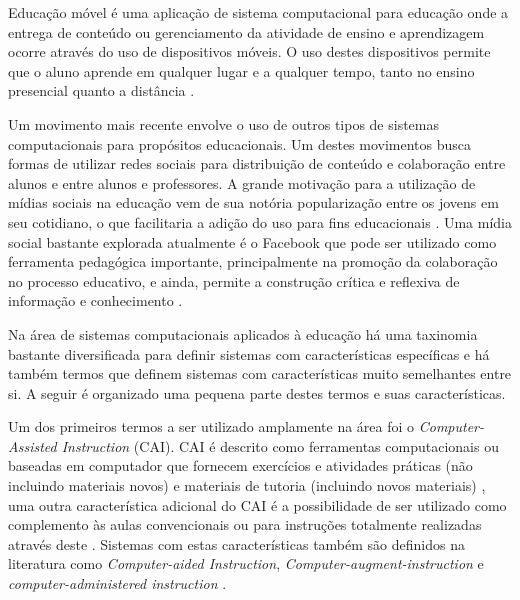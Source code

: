 
Educação móvel é uma aplicação de sistema computacional para educação onde a entrega de conteúdo ou gerenciamento da atividade de ensino e aprendizagem ocorre através do uso de dispositivos móveis. O uso destes dispositivos permite que o aluno aprende em qualquer lugar e a qualquer tempo, tanto no ensino presencial quanto a distância \cite{mlearning09}.

Um movimento mais recente envolve o uso de outros tipos de sistemas computacionais para propósitos educacionais. Um destes movimentos busca formas de utilizar redes sociais para distribuição de conteúdo e colaboração entre alunos e entre alunos e professores. A grande motivação para a utilização de mídias sociais na educação vem de sua notória popularização entre os jovens em seu cotidiano, o que facilitaria a adição do uso para fins educacionais \cite{dotta_uso_2011}. Uma mídia social bastante explorada atualmente é o Facebook que pode ser utilizado como ferramenta pedagógica importante,
principalmente na promoção da colaboração no processo educativo, e ainda, permite a construção crítica e reflexiva de informação e conhecimento \cite{facebook11}.


 Na área de sistemas computacionais aplicados à educação há uma taxinomia bastante diversificada para definir sistemas com características específicas e há também termos que definem sistemas com características muito semelhantes entre si. A seguir é organizado uma pequena parte destes termos e suas características.

Um dos primeiros termos a ser utilizado amplamente na área foi o \emph{Computer-Assisted Instruction} (CAI). CAI é descrito como ferramentas computacionais ou baseadas em computador que fornecem exercícios e atividades práticas (não incluindo materiais novos) e materiais de tutoria (incluindo novos materiais) \cite{wheres98}, uma outra característica adicional do CAI é a possibilidade de ser utilizado como complemento às aulas convencionais ou para instruções totalmente realizadas através deste \cite{cotton91}. Sistemas com estas características também são definidos na literatura como \emph{Computer-aided Instruction}, \emph{Computer-augment-instruction} e \emph{computer-administered instruction} \cite{effectiveness85}.

